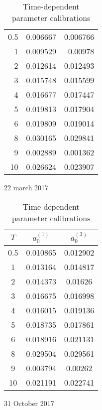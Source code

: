 \documentclass[12pt,a4paper]{article}
\theoremstyle{plain}
\numberwithin{equation}{section}
\begin{document}
\begin{table}[t]
\begin{subtable}{.4\textwidth}
\begin{tabular}{|rrr|}
    0.5   & 0.006667 & 0.006766 \\
    1     & 0.009529 & 0.00978 \\
    2     & 0.012614 & 0.012493 \\
    3     & 0.015748 & 0.015599 \\
    4     & 0.016677 & 0.017447 \\
    5     & 0.019813 & 0.017904 \\
    6     & 0.019809 & 0.019014 \\
    8     & 0.030165 & 0.029841 \\
    9     & 0.002889 & 0.001362 \\
    10    & 0.026624 & 0.023907 \\

     \hline
    \end{tabular}
\caption{22 march 2017}
\end{subtable}
\begin{subtable}{.4\textwidth}
\centering
     \begin{tabular}{|ccc|}
    \hline
    $T$ &$a_0^{(1)}$ & $a_0^{(3)}$ \\
    \hline

    0.5   & 0.010865 & 0.012902 \\
    1     & 0.013164 & 0.014817 \\
    2     & 0.014373 & 0.01626 \\
    3     & 0.016675 & 0.016998 \\
    4     & 0.016015 & 0.019136 \\
    5     & 0.018735 & 0.017861 \\
    6     & 0.018916 & 0.021131 \\
    8     & 0.029504 & 0.029561 \\
    9     & 0.003794 & 0.00262 \\
    10    & 0.021191 & 0.022741 \\

     \hline
    \end{tabular}%
\caption{31 October 2017}
\end{subtable}\vspace*{1.5em}


\caption{Time-dependent parameter calibrations}\label{tab:a0}

\end{table}
\end{document}
